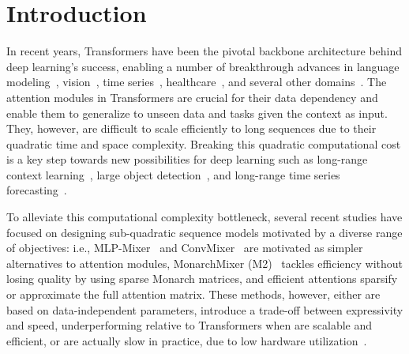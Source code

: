 \documentclass{article}
\newcommand*\circled[1]{\tikz[baseline=(char.base)]{
            \node[shape=circle,draw,inner sep=0.3pt, fill=c2] (char) {\textcolor{white}{#1}};}}
\begin{document}
\section{Introduction}
In recent years, Transformers \citep{vaswani2017attention} have been the pivotal backbone architecture behind deep learning’s success, enabling a number of breakthrough advances in language modeling~\citep{wolf2019huggingface}, vision~\citep{dosovitskiy2021ViT}, time series~\citep{zhou2021informer}, healthcare~\citep{Tang2023Brain}, and several other domains~\citep{radford2023robust, behrouz2023unsupervised}. The attention modules in Transformers are crucial for their data dependency and enable them to generalize to unseen data and tasks given the context as input. They, however, are difficult to scale efficiently to long sequences due to their quadratic time and space complexity. Breaking this quadratic computational cost is a key step towards new possibilities for deep learning such as long-range context learning~\citep{gu2023mamba}, large object detection~\citep{zhu2024ViM}, and long-range time series forecasting~\citep{liu2021pyraformer}.


To alleviate this computational complexity bottleneck, several recent studies have focused on designing sub-quadratic sequence models motivated by a diverse range of objectives: i.e., MLP-Mixer~\citep{tolstikhin2021mlp} and  ConvMixer~\citep{trockman2023patches} are motivated as simpler alternatives to attention modules, MonarchMixer (M2)~\citep{fu2023monarch} tackles efficiency without losing quality by using sparse Monarch matrices, and efficient attentions \citep{xiao2024efficient, kacham2023polysketchformer, ding2023longnet, chen2021scatterbrain} sparsify or approximate the full attention matrix. These methods, however, either \circled{1} are based on data-independent parameters,  \circled{2} introduce a trade-off between expressivity and speed, underperforming relative to Transformers when are scalable and efficient, or \circled{3} are actually slow in practice, due to low hardware utilization~\citep{dao2022monarch, chen2021scatterbrain}. 
\end{document}

